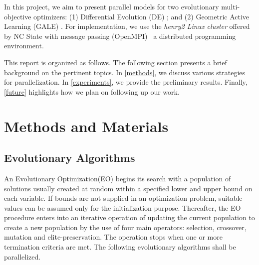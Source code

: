 \documentclass[conference]{IEEEtran}
\begin{document}
%
%

In this project, we aim to present parallel models for two evolutionary multi-objective optimizers: (1) Differential Evolution (DE) \cite{storn97}; and (2) Geometric Active Learning (GALE) \cite{krall15}. For implementation, we use the \textit{henry2 Linux cluster} offered by NC State with message passing (OpenMPI)~\cite{openMPI04} a distributed programming environment.

This report is organized as follows. The following section presents a brief background on the pertinent topics. In \textsection\ref{methods}, we discuss various strategies for parallelization. In \textsection\ref{experiments}, we provide the preliminary results. Finally, \textsection\ref{future} highlights how we plan on following up our work.

\section{Methods and Materials}
\label{algos}
\subsection{Evolutionary Algorithms}
An Evolutionary Optimization(EO) begins its search with a population of solutions usually created at random within a specified lower and upper bound on each variable. If bounds are not supplied in an optimization problem, suitable values can be assumed only for the initialization purpose. Thereafter, the EO procedure enters into an iterative operation of updating the current population to create a new population by the use of four main operators: selection, crossover, mutation and elite-preservation. The operation stops when one or more termination criteria are met. The following evolutionary algorithms shall be parallelized.
\end{document}
